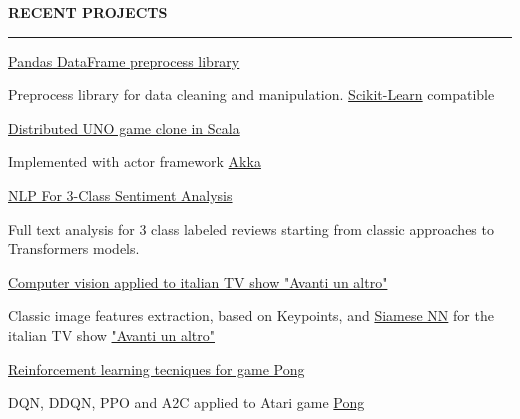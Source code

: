 \documentclass[10pt, a4paper, ragged2e]{altacv}
\newcommand{\position}[2]{%
  {\color{emphasis}%
    {\large{#1}}\hfill{\raisebox{1pt}{\small{#2}}}\par%
  }%
}
\renewcommand{\divider}[1][]{%
  \ifstrequal{#1}{empty}{\vspace{-4pt}}{}%
  \par\vspace{-.333ex}%
  \textcolor{body!37.5}{\hdashrule{\linewidth}{0.6pt}{0.5ex}}\medskip%
}
\renewcommand{\cvsection}[3][]{%
  \bigskip%
  \ifstrequal{#1}{}{}{\marginpar{\vspace*{\dimexpr1pt-\baselineskip}}}%
  {\color{heading}\LARGE\bfseries\MakeUppercase{#2}\hfill\Large{#3}}\\[-1ex]%
  {\color{heading}\rule{\linewidth}{2pt}\par}\medskip
}
\begin{document}
\medskip


\cvsection{Recent Projects}{\faBook}

\position{
  \href{https://github.com/Lorenzo-Gardini/PTPS?tab=readme-ov-file}
  {Pandas DataFrame preprocess library}
  }{}%
Preprocess library for data cleaning and manipulation. \href{https://scikit-learn.org/stable/}{Scikit-Learn} compatible
\divider[empty]{}

\position{%
  \href{https://github.com/Lorenzo-Gardini/Computer-vision}%
  {Distributed UNO game clone in Scala}%
}{}
Implemented with actor framework \href{https://akka.io/}{Akka}
\divider[empty]{}

\position{%
  \href{https://github.com/Lorenzo-Gardini/TextMining}%
  {NLP For 3-Class Sentiment Analysis}%
}{}
Full text analysis for 3 class labeled reviews starting from classic approaches to Transformers models.
\divider[empty]{}

\position{%
  \href{https://github.com/Lorenzo-Gardini/Computer-vision}%
  {Computer vision applied to italian TV show "Avanti un altro"}%
}{}
Classic image features extraction, based on Keypoints, and \href{https://en.wikipedia.org/wiki/Siamese_neural_network}{Siamese NN} for the italian TV show \href{https://it.wikipedia.org/wiki/Avanti_un_altro!#Gioco_finale}{"Avanti un altro"} 
\divider[empty]{}

\position{%
  \href{https://github.com/Lorenzo-Gardini/Computer-vision}%
  {Reinforcement learning tecniques for game Pong}%
}{}
DQN, DDQN, PPO and A2C applied to Atari game \href{https://en.wikipedia.org/wiki/Pong}{Pong}
\end{document}
